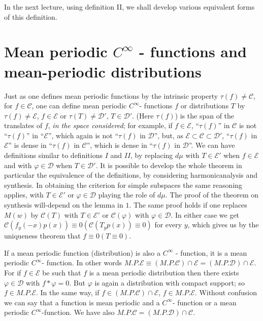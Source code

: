 In the next lecture, using definition II, we shall develop various
equivalent forms of this definition. 

\section[Mean periodic \texorpdfstring{$C^\infty$}{Cinfty} - functions and...]{Mean periodic \texorpdfstring{$C^\infty$}{Cinfty} - functions and mean-periodic
  distributions}\label{chap5:sec3} %

Just as one defines mean periodic functions by the intrinsic property
$\tau (f) \neq \mathscr{C}$, for $f \in \mathscr{C}$, one can
define mean periodic $C^\infty$- functions $f$ or distributions $T$ by
$\tau (f) \neq \mathscr{E}$, $f \in \mathscr{E}$ or $\tau (T) \neq
\mathscr{D}'$, $T \in \mathscr{D}'$. (Here $\tau (f)$) is the span of
the translates of $f$, \textit{in the space considered}; for example,
if $f \in \mathscr{E}$, ``$\tau(f)$'' in $\mathscr{C}$ is not ``$
\tau (f)$'' in ``$\mathscr{E}$'', which again is not ``$\tau (f)$ in $
\mathscr{D}$'', but, as $\mathscr{E} \subset \mathscr{C} \subset
\mathscr{D}'$, ``$\tau (f)$ in $\mathscr{E}$'' is dense in ``$\tau (f)$
in $\mathscr{C}$'', which is dense in ``$\tau (f)$ in $\mathscr{D}$''. We
can have definitions similar to definitions $I$ and $II$, by replacing
$d\mu$ with $T \in \mathscr{E}'$ when $ f \in \mathscr{E}$ and with
$\varphi \in \mathscr{D}$ when $T \in \mathscr{D}'$. It is possible to
develop the whole theorem in particular the equivalence of the
definitions, by considering harmonic\pageoriginale analysis and synthesis. In
obtaining the criterion for simple subspaces the same reasoning
applies, with $T \in \mathscr{E}'$ or $\varphi \in \mathscr{D}$
playing the role of $d \mu$. The proof of the theorem on synthesis
will-depend on the lemma in $1$. The same proof holds if one replaces
$M(w)$ by $\mathscr{C}(T)$ with $T \in \mathscr{E}'$ or $\mathscr{C}
(\varphi)$ with $\varphi \in \mathscr{D}$. In either case we get
$\mathscr{C} (f_y (-x) p(x))\equiv 0 (\mathscr{C}(T_y p(x)) \equiv 0)$
for every $y$, which gives us by the uniqueness theorem that $f \equiv
0 (T \equiv 0)$. 

If a mean periodic function (distribution) is also a $C^\infty$ -
function, it is a mean periodic $C^\infty$- function. In other words
$M.P. \mathscr{E} \equiv (M.P. \mathscr{C}) \cap \mathscr{E} =
(M.P. \mathscr{D}) \cap \mathscr{E}$. For if $f \in \mathscr{E}$ be
such that $f$ is a mean periodic distribution then there exists
$\varphi \in \mathscr{D}$ with $f * \varphi = 0$. But $\varphi$ is
again a distribution with compact support; so $f \in
M.P.\mathscr{E}$. In the same way, if $f \in (M.P.\mathscr{C}) \cap
\mathscr{E}$, $f \in M.P. \mathscr{E}$. Without confusion we can say
that a function is mean periodic and a $C^{\infty}$- function or a
mean periodic $C^{\infty}$-function. We have also $M.P. \mathscr{C} =
(M.P.\mathscr{D}) \cap \mathscr{C}$. 

